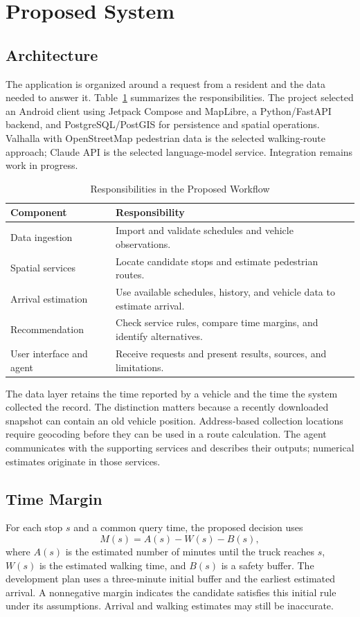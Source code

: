 \section{Proposed System}\label{sec:scheme}
\subsection{Architecture}
The application is organized around a request from a resident and the data needed to answer it. Table~\ref{tab:components} summarizes the responsibilities. The project selected an Android client using Jetpack Compose and MapLibre, a Python/FastAPI backend, and PostgreSQL/PostGIS for persistence and spatial operations. Valhalla with OpenStreetMap pedestrian data is the selected walking-route approach; Claude API is the selected language-model service. Integration remains work in progress.

\begin{table}[htbp]
\caption{Responsibilities in the Proposed Workflow}
\label{tab:components}
\centering\footnotesize
\begin{tabular}{@{}p{}p{}@{}}
\toprule Component & Responsibility \\
\midrule
Data ingestion & Import and validate schedules and vehicle observations. \\
Spatial services & Locate candidate stops and estimate pedestrian routes. \\
Arrival estimation & Use available schedules, history, and vehicle data to estimate arrival. \\
Recommendation & Check service rules, compare time margins, and identify alternatives. \\
User interface and agent & Receive requests and present results, sources, and limitations. \\
\bottomrule
\end{tabular}
\end{table}

The data layer retains the time reported by a vehicle and the time the system collected the record. The distinction matters because a recently downloaded snapshot can contain an old vehicle position. Address-based collection locations require geocoding before they can be used in a route calculation. The agent communicates with the supporting services and describes their outputs; numerical estimates originate in those services.

\subsection{Time Margin}
For each stop $s$ and a common query time, the proposed decision uses
\begin{equation}
M(s)=A(s)-W(s)-B(s),
\label{eq:margin}
\end{equation}
where $A(s)$ is the estimated number of minutes until the truck reaches $s$, $W(s)$ is the estimated walking time, and $B(s)$ is a safety buffer. The development plan uses a three-minute initial buffer and the earliest estimated arrival. A nonnegative margin indicates the candidate satisfies this initial rule under its assumptions. Arrival and walking estimates may still be inaccurate.

